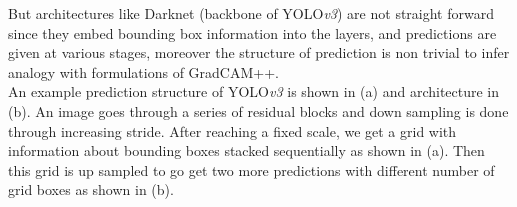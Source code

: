 \documentclass[letterpaper]{article}
\begin{document}
But architectures like Darknet (backbone of YOLO\emph{v3}) are not straight forward since they embed bounding box information into the layers, and predictions are given at various stages, moreover the structure of prediction is non trivial to infer analogy with formulations of GradCAM++.\\
An example prediction structure of YOLO\emph{v3} is shown in (a) and architecture in (b). An image goes through a series of residual blocks and down sampling is done through increasing stride. After reaching a fixed scale, we get a grid with information about bounding boxes stacked sequentially as shown in (a). Then this grid is up sampled to go get two more predictions with different number of grid boxes as shown in (b).\\
\end{document}
